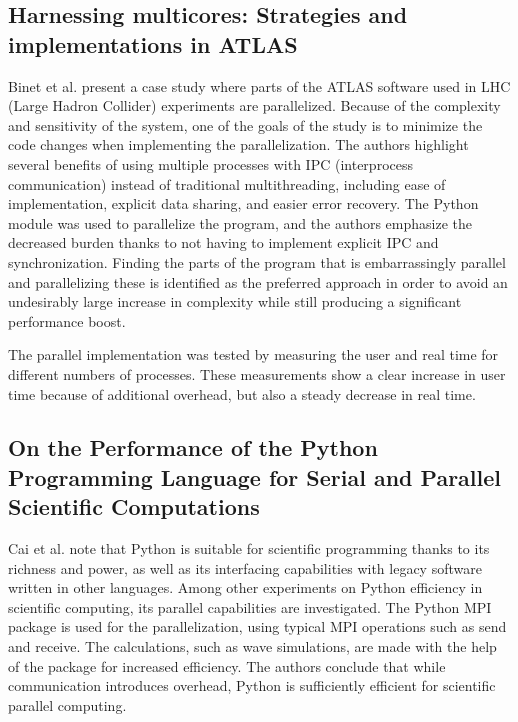 \subsection{Harnessing multicores: Strategies and implementations in ATLAS}
Binet et al. \cite{binet_2010_harnessing_hmsaiia} present a case study where parts of the ATLAS software used in
LHC (Large Hadron Collider) experiments are parallelized. Because of the complexity and sensitivity of the system,
one of the goals of the study is to minimize the code changes when implementing the parallelization. The authors highlight several
benefits of using multiple processes with IPC (interprocess communication) instead of traditional multithreading, including ease of 
implementation, explicit data sharing, and easier error recovery. The Python  module was used to parallelize
the program, and the authors emphasize the decreased burden thanks to not having to implement explicit IPC and synchronization.
Finding the parts of the program that is embarrassingly parallel and parallelizing these is
identified as the preferred approach in order to avoid an undesirably large increase in complexity while
still producing a significant performance boost.

The parallel implementation was tested by measuring the user and real time for different numbers of processes.
These measurements show a clear increase in user time because of additional overhead, but also a steady decrease in real time.

\subsection{On the Performance of the Python Programming Language for Serial and Parallel Scientific Computations}
Cai et al. \cite{cai_2005_performance_otpotpplfsapsc} note that Python is suitable for scientific programming thanks to its richness and
power, as well as its interfacing capabilities with legacy software written in other languages. Among other experiments on Python
efficiency in scientific computing, its parallel capabilities are investigated. The Python MPI package  is used for
the parallelization, using typical MPI operations such as send and receive. The calculations, such as wave simulations, 
are made with the help of the  package for increased efficiency. The authors conclude that while communication 
introduces overhead, Python is sufficiently efficient for scientific parallel computing.

